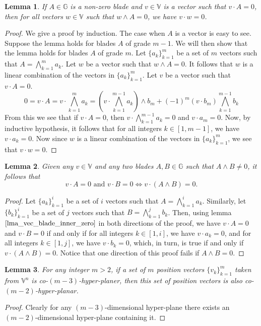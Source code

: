 \documentclass[12pt]{article}
\newcommand{\G}{\mathbb{G}}
\newcommand{\V}{\mathbb{V}}
\newtheorem{lemma}{Lemma}[section]
\begin{document}
\begin{lemma}\label{lma_vec_blade_inner_zero}
If $A\in\G$ is a non-zero blade and $v\in\V$ is a vector such that $v\cdot A=0$, then
for all vectors $w\in\V$ such that $w\wedge A=0$, we have $v\cdot w=0$.
\end{lemma}
\begin{proof}
We give a proof by induction.  The case when $A$ is a vector is easy to see.
Suppose the lemma holds for blades $A$ of grade $m-1$.  We will then show that the
lemma holds for blades $A$ of grade $m$.  Let $\{a_k\}_{k=1}^m$ be a set of $m$
vectors such that $A=\bigwedge_{k=1}^m a_k$.  Let $w$ be a vector such that
$w\wedge A=0$.  It follows that $w$ is a linear combination of the vectors in $\{a_k\}_{k=1}^m$.
Let $v$ be a vector such that $v\cdot A=0$.
\begin{equation*}
0 = v\cdot A = v\cdot \bigwedge_{k=1}^m a_k
 = \left(v\cdot\bigwedge_{k=1}^{m-1} a_k\right)\wedge b_m + (-1)^m(v\cdot b_m)\bigwedge_{k=1}^{m-1} b_k
\end{equation*}
From this we see that if $v\cdot A=0$, then $v\cdot\bigwedge_{k=1}^{m-1} a_k=0$ and $v\cdot a_m=0$.
Now, by inductive hypothesis, it follows that for all integers $k\in[1,m-1]$, we have $v\cdot a_k=0$.
Now since $w$ is a linear combination of the vectors in $\{a_k\}_{k=1}^m$, we see that $v\cdot w=0$.
\end{proof}

\begin{lemma}\label{lma_intersect}
Given any $v\in\V$ and any two blades $A,B\in\G$ such that $A\wedge B\neq 0$,
it follows that
\begin{equation*}
\mbox{$v\cdot A=0$ and $v\cdot B=0 \iff v\cdot(A\wedge B)=0$.}
\end{equation*}
\end{lemma}
\begin{proof}
Let $\{a_k\}_{k=1}^i$ be a set of $i$ vectors such that $A=\bigwedge_{k=1}^i a_k$.
Similarly, let $\{b_k\}_{k=1}^i$ be a set of $j$ vectors such that
$B=\bigwedge_{k=1}^j b_k$.  Then, using lemma $\eqref{lma_vec_blade_inner_zero}$ in both
directions of the proof, we have
$v\cdot A=0$ and $v\cdot B=0$ if and only if for all integers $k\in[1,i]$,
we have $v\cdot a_k=0$, and for all integers $k\in[1,j]$, we have $v\cdot b_k=0$, which,
in turn, is true if and only if $v\cdot(A\wedge B)=0$.  Notice that one direction of this
proof fails if $A\wedge B=0$.
\end{proof}

\begin{lemma}\label{lma_mm3_imp_mm2}
For any integer $m>2$, if a set of $m$ position vectors $\{v_k\}_{k=1}^m$
taken from $\V^n$ is co-$(m-3)$-hyper-planer, then this set of position vectors is
also co-$(m-2)$-hyper-planar.
\end{lemma}
\begin{proof}
Clearly for any $(m-3)$-dimensional hyper-plane there exists an $(m-2)$-dimensional
hyper-plane containing it.
\end{proof}
\end{document}
